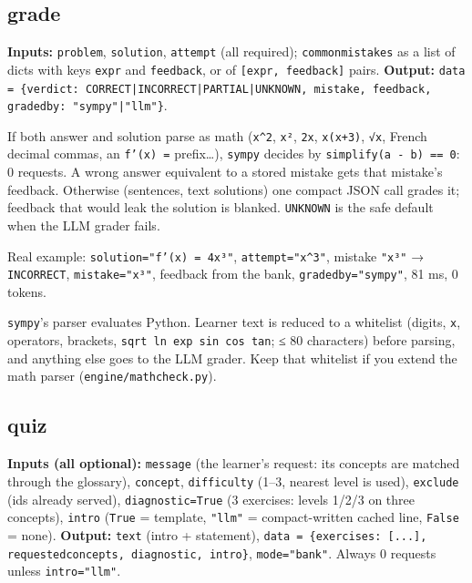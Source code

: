 \documentclass[11pt,a4paper]{article}
\renewcommand{\_}{\origus\allowbreak}
\begin{document}
\subsection{grade}

\textbf{Inputs:} \texttt{problem}, \texttt{solution}, \texttt{attempt} (all required); \texttt{common\_mistakes} as a list
of dicts with keys \texttt{expr} and \texttt{feedback}, or of \texttt{[expr, feedback]} pairs.
\textbf{Output:} \texttt{data = \{verdict: CORRECT|INCORRECT|PARTIAL|UNKNOWN, mistake, feedback, graded\_by: "sympy"|"llm"\}}.

If both answer and solution parse as math (\texttt{x\textasciicircum{}2}, \texttt{x²}, \texttt{2x}, \texttt{x(x+3)}, \texttt{√x}, French decimal
commas, an \texttt{f'(x) =} prefix\dots), \texttt{sympy} decides by \texttt{simplify(a - b) == 0}: 0 requests. A wrong
answer equivalent to a stored mistake gets that mistake's feedback. Otherwise (sentences, text
solutions) one compact JSON call grades it; feedback that would leak the solution is blanked.
\texttt{UNKNOWN} is the safe default when the LLM grader fails.

Real example: \texttt{solution="f'(x) = 4x³"}, \texttt{attempt="x\textasciicircum{}3"}, mistake \texttt{"x³"} → \texttt{INCORRECT},
\texttt{mistake="x³"}, feedback from the bank, \texttt{graded\_by="sympy"}, 81 ms, 0 tokens.

\begin{warn}[Security]
\texttt{sympy}'s parser evaluates Python. Learner text is reduced to a whitelist (digits, \texttt{x}, operators,
brackets, \texttt{sqrt ln exp sin cos tan}; ≤ 80 characters) before parsing, and anything else goes to the
LLM grader. Keep that whitelist if you extend the math parser (\texttt{engine/mathcheck.py}).
\end{warn}

\subsection{quiz}

\textbf{Inputs (all optional):} \texttt{message} (the learner's request: its concepts are matched through the
glossary), \texttt{concept}, \texttt{difficulty} (1–3, nearest level is used), \texttt{exclude} (ids already served),
\texttt{diagnostic=True} (3 exercises: levels 1/2/3 on three concepts), \texttt{intro} (\texttt{True} = template,
\texttt{"llm"} = compact-written cached line, \texttt{False} = none).
\textbf{Output:} \texttt{text} (intro + statement), \texttt{data = \{exercises: [...], requested\_concepts,
diagnostic, intro\}}, \texttt{mode="bank"}. Always 0 requests unless \texttt{intro="llm"}.
\end{document}
